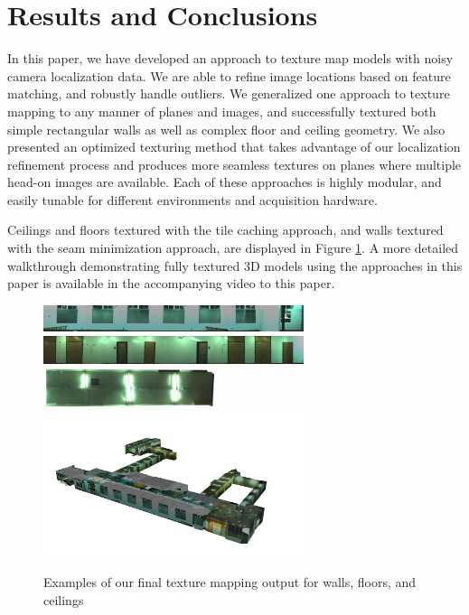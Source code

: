 \documentclass[10pt,twocolumn,letterpaper]{article}
\begin{document}
\section{Results and Conclusions}
\label{sec:resultsAndConclusions}
In this paper, we have developed an approach to texture map models with noisy camera localization data. We are
able to refine image locations based on feature matching, and robustly
handle outliers.  We generalized one approach to texture mapping to
any manner of planes and images, and successfully textured both simple
rectangular walls as well as complex floor and ceiling geometry. We
also presented an optimized texturing method that takes advantage of
our localization refinement process and produces more seamless textures on
planes where multiple head-on images are available. Each of these
approaches is highly modular, and easily tunable for different
environments and acquisition hardware.

Ceilings and floors textured with the tile caching approach, and walls
textured with the seam minimization approach, are displayed in Figure
\ref{fig:results}. A more detailed walkthrough demonstrating fully
textured 3D models using the approaches in this paper is available in
the accompanying video to this paper.

\begin{figure}
  \centering
  \includegraphics[width=3in]{4thfloor21.jpg}
  \includegraphics[width=3in]{4thfloor61.jpg}
  \includegraphics[width=2in]{4thfloor8.jpg}
  \includegraphics[width=3in]{fullmodel.png}
  \caption{Examples of our final texture mapping output for walls,
    floors, and ceilings}
  \label{fig:results}
\end{figure}

{\small   }
\end{document}
